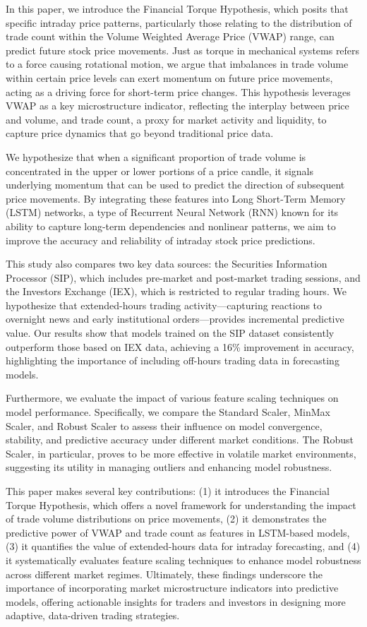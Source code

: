 \documentclass[letterpaper]{article}
\begin{document}
In this paper, we introduce the Financial Torque Hypothesis, which posits that specific intraday price patterns, particularly those relating to the distribution of trade count within the Volume Weighted Average Price (VWAP) range, can predict future stock price movements. Just as torque in mechanical systems refers to a force causing rotational motion, we argue that imbalances in trade volume within certain price levels can exert momentum on future price movements, acting as a driving force for short-term price changes. This hypothesis leverages VWAP as a key microstructure indicator, reflecting the interplay between price and volume, and trade count, a proxy for market activity and liquidity, to capture price dynamics that go beyond traditional price data.

We hypothesize that when a significant proportion of trade volume is concentrated in the upper or lower portions of a price candle, it signals underlying momentum that can be used to predict the direction of subsequent price movements. By integrating these features into Long Short-Term Memory (LSTM) networks, a type of Recurrent Neural Network (RNN) known for its ability to capture long-term dependencies and nonlinear patterns, we aim to improve the accuracy and reliability of intraday stock price predictions.

This study also compares two key data sources: the Securities Information Processor (SIP), which includes pre-market and post-market trading sessions, and the Investors Exchange (IEX), which is restricted to regular trading hours. We hypothesize that extended-hours trading activity—capturing reactions to overnight news and early institutional orders—provides incremental predictive value. Our results show that models trained on the SIP dataset consistently outperform those based on IEX data, achieving a 16\% improvement in accuracy, highlighting the importance of including off-hours trading data in forecasting models.

Furthermore, we evaluate the impact of various feature scaling techniques on model performance. Specifically, we compare the Standard Scaler, MinMax Scaler, and Robust Scaler to assess their influence on model convergence, stability, and predictive accuracy under different market conditions. The Robust Scaler, in particular, proves to be more effective in volatile market environments, suggesting its utility in managing outliers and enhancing model robustness.

This paper makes several key contributions: (1) it introduces the Financial Torque Hypothesis, which offers a novel framework for understanding the impact of trade volume distributions on price movements, (2) it demonstrates the predictive power of VWAP and trade count as features in LSTM-based models, (3) it quantifies the value of extended-hours data for intraday forecasting, and (4) it systematically evaluates feature scaling techniques to enhance model robustness across different market regimes. Ultimately, these findings underscore the importance of incorporating market microstructure indicators into predictive models, offering actionable insights for traders and investors in designing more adaptive, data-driven trading strategies.
\end{document}
